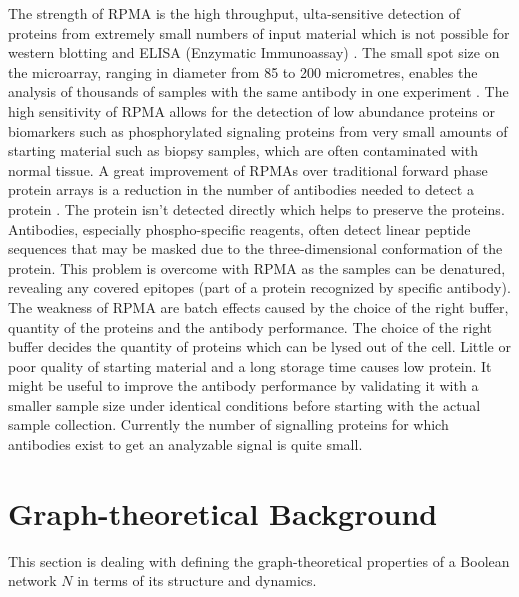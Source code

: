 The strength of RPMA is the high throughput, ulta-sensitive detection of proteins from extremely small numbers of input material which is not possible for western blotting and \gls{ELISA} (Enzymatic Immunoassay) \citep{Boellner.2015}. The small spot size on the microarray, ranging in diameter from 85 to 200 micrometres, enables the analysis of thousands of samples with the same antibody in one experiment \citep{Ramaswamy.2005}. The high sensitivity of RPMA allows for the detection of low abundance proteins or biomarkers such as phosphorylated signaling proteins from very small amounts of starting material such as biopsy samples, which are often contaminated with normal tissue\citep{Sheehan.2005}. A great improvement of RPMAs over traditional forward phase protein arrays is a reduction in the number of antibodies needed to detect a protein \citep{Sheehan.2005, Liotta.2003}. The protein isn't detected directly which helps to preserve the proteins. Antibodies, especially phospho-specific reagents, often detect linear peptide sequences that may be masked due to the three-dimensional conformation of the protein. This problem is overcome with RPMA as the samples can be denatured, revealing any covered epitopes (part of a protein recognized by specific antibody)\citep{Liotta.2003}.\\

The weakness of RPMA are batch effects caused by the choice of the right buffer, quantity of the proteins and the antibody performance.
The choice of the right buffer decides the quantity of proteins which can be lysed out of the cell. Little or poor quality of starting material and a long storage time causes low protein. It might be useful to improve the antibody performance by validating it with a smaller sample size under identical conditions before starting with the actual sample collection. Currently the number of signalling proteins for which antibodies exist to get an analyzable signal is quite small. \\

\newpage
\section{Graph-theoretical Background}
This section is dealing with defining the graph-theoretical properties of a Boolean network $N$ in terms of its structure and dynamics.\\


